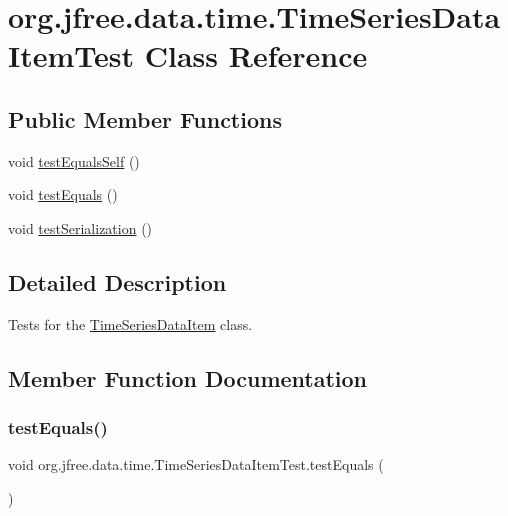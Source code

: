 \hypertarget{classorg_1_1jfree_1_1data_1_1time_1_1_time_series_data_item_test}{}\section{org.\+jfree.\+data.\+time.\+Time\+Series\+Data\+Item\+Test Class Reference}
\label{classorg_1_1jfree_1_1data_1_1time_1_1_time_series_data_item_test}
\subsection*{Public Member Functions}
\begin{DoxyCompactItemize}
\item 
void \mbox{\hyperlink{classorg_1_1jfree_1_1data_1_1time_1_1_time_series_data_item_test_a180c03bcd3d3995a0345e41a44327ea7}{test\+Equals\+Self}} ()
\item 
void \mbox{\hyperlink{classorg_1_1jfree_1_1data_1_1time_1_1_time_series_data_item_test_a18cdba710775377a4525ea91251426c5}{test\+Equals}} ()
\item 
void \mbox{\hyperlink{classorg_1_1jfree_1_1data_1_1time_1_1_time_series_data_item_test_a7dba893ce8a571ee4eebec0793ff3e98}{test\+Serialization}} ()
\end{DoxyCompactItemize}


\subsection{Detailed Description}
Tests for the \mbox{\hyperlink{classorg_1_1jfree_1_1data_1_1time_1_1_time_series_data_item}{Time\+Series\+Data\+Item}} class. 

\subsection{Member Function Documentation}
\mbox{\label{classorg_1_1jfree_1_1data_1_1time_1_1_time_series_data_item_test_a18cdba710775377a4525ea91251426c5}} 
\subsubsection{\texorpdfstring{test\+Equals()}{testEquals()}}
{\footnotesize\ttfamily void org.\+jfree.\+data.\+time.\+Time\+Series\+Data\+Item\+Test.\+test\+Equals (\begin{DoxyParamCaption}{ }\end{DoxyParamCaption})}


